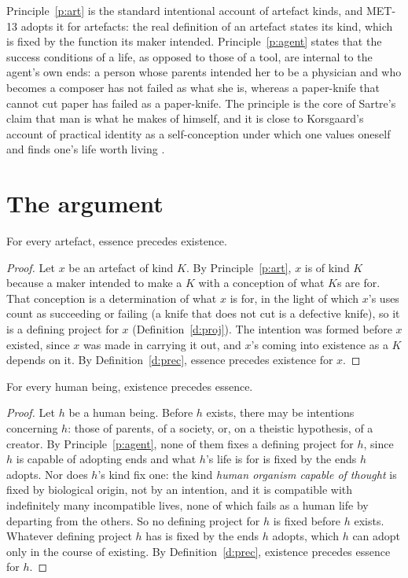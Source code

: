 \documentclass{situationist-preprint}
\begin{document}
Principle~\ref{p:art} is the standard intentional account of artefact kinds, and MET-13 adopts it for artefacts: the real definition of an artefact states its kind, which is fixed by the function its maker intended. Principle~\ref{p:agent} states that the success conditions of a life, as opposed to those of a tool, are internal to the agent's own ends: a person whose parents intended her to be a physician and who becomes a composer has not failed as what she is, whereas a paper-knife that cannot cut paper has failed as a paper-knife. The principle is the core of Sartre's claim that man is what he makes of himself, and it is close to Korsgaard's account of practical identity as a self-conception under which one values oneself and finds one's life worth living \citep{Korsgaard1996}.

\section{The argument}

\begin{lemma}\label{l:art}
For every artefact, essence precedes existence.
\end{lemma}

\begin{proof}
Let $x$ be an artefact of kind $K$. By Principle~\ref{p:art}, $x$ is of kind $K$ because a maker intended to make a $K$ with a conception of what $K$s are for. That conception is a determination of what $x$ is for, in the light of which $x$'s uses count as succeeding or failing (a knife that does not cut is a defective knife), so it is a defining project for $x$ (Definition~\ref{d:proj}). The intention was formed before $x$ existed, since $x$ was made in carrying it out, and $x$'s coming into existence as a $K$ depends on it. By Definition~\ref{d:prec}, essence precedes existence for $x$.
\end{proof}

\begin{lemma}\label{l:hum}
For every human being, existence precedes essence.
\end{lemma}

\begin{proof}
Let $h$ be a human being. Before $h$ exists, there may be intentions concerning $h$: those of parents, of a society, or, on a theistic hypothesis, of a creator. By Principle~\ref{p:agent}, none of them fixes a defining project for $h$, since $h$ is capable of adopting ends and what $h$'s life is for is fixed by the ends $h$ adopts. Nor does $h$'s kind fix one: the kind \emph{human organism capable of thought} is fixed by biological origin, not by an intention, and it is compatible with indefinitely many incompatible lives, none of which fails as a human life by departing from the others. So no defining project for $h$ is fixed before $h$ exists. Whatever defining project $h$ has is fixed by the ends $h$ adopts, which $h$ can adopt only in the course of existing. By Definition~\ref{d:prec}, existence precedes essence for $h$.
\end{proof}
\end{document}
